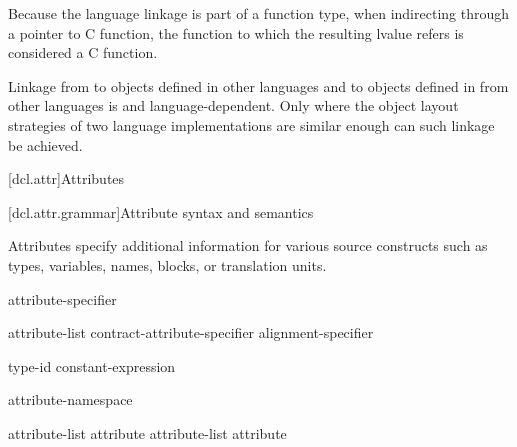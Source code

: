 \pnum
\begin{note}
Because the language linkage is part of a function type, when
indirecting through a pointer to C function, the function to
which the resulting lvalue refers is considered a C function.
\end{note}

\pnum
{}%
%
Linkage from \Cpp{} to objects defined in other languages and to objects
defined in \Cpp{} from other languages is  and
language-dependent. Only where the object layout strategies of two
language implementations are similar enough can such linkage be
achieved.%

[dcl.attr]{Attributes}%

[dcl.attr.grammar]{Attribute syntax and semantics}

\pnum
{}%
Attributes specify additional information for various source constructs
such as types, variables, names, blocks, or translation units.

\begin{bnf}
\br
   attribute-specifier
\end{bnf}

\begin{bnf}
\br
  \terminal{[} \terminal{[}  attribute-list \terminal{]} \terminal{]}\br
  contract-attribute-specifier\br
  alignment-specifier
\end{bnf}

\begin{bnf}
\br
   type-id  \terminal{)}\br
   constant-expression  \terminal{)}
\end{bnf}

\begin{bnf}
\br
   attribute-namespace \terminal{:}
\end{bnf}

\begin{bnf}
\br
  \br
  attribute-list \terminal{,} \br
  attribute \br
  attribute-list \terminal{,} attribute 
\end{bnf}

